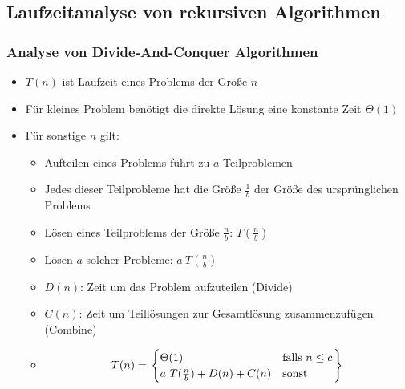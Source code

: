 \documentclass[
    ngerman,
    color=3b,
    dark_mode,
    load_common, %
    summary,
    boxarc,
]{rubos-tuda-template}
\begin{document}
\subsection{Laufzeitanalyse von rekursiven Algorithmen}\label{Laufzeit rekursive Algorithmen}
\subsubsection{Analyse von Divide-And-Conquer Algorithmen}\mbox{}
\begin{itemize}
    \item $T(n)$ ist Laufzeit eines Problems der Grö\ss{}e $n$
    \item Für kleines Problem benötigt die direkte Lösung eine konstante Zeit $\Theta(1)$
    \item Für sonstige $n$ gilt:
          \begin{itemize}
              \item Aufteilen eines Problems führt zu $a$ Teilproblemen
              \item Jedes dieser Teilprobleme hat die Grö\ss{}e $\frac{1}{b}$ der Grö\ss{}e des ursprünglichen Problems
              \item Lösen eines Teilproblems der Grö\ss{}e $\frac{n}{b}$: $T(\frac{n}{b})$
              \item Lösen $a$ solcher Probleme: $a~T(\frac{n}{b})$
              \item $D(n)$: Zeit um das Problem aufzuteilen (Divide)
              \item $C(n)$: Zeit um Teillösungen zur Gesamtlösung zusammenzufügen (Combine)
              \item[] \[
                      T(n) = \left.
                      \begin{cases}
                          \hiderowcolors
                          \Theta(1)                      & \text{falls } n \leq c \\
                          a~T(\frac{n}{b}) + D(n) + C(n) & \text{sonst}           \\
                      \end{cases}
                      \right \}
                  \]
          \end{itemize}
\end{itemize}
\end{document}
